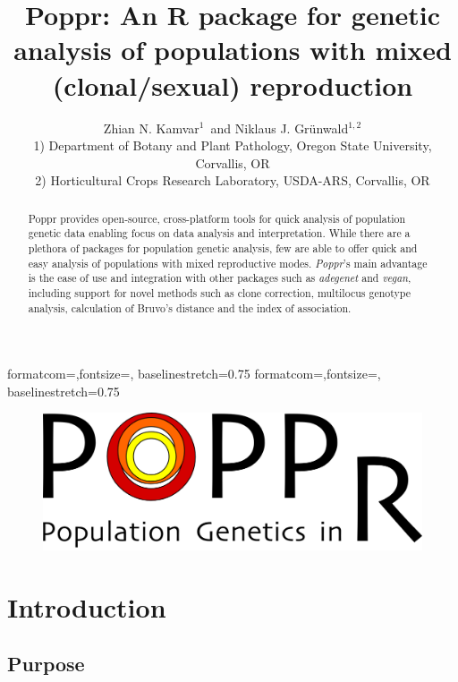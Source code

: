\documentclass[letterpaper]{article}
\title{Poppr: An R package for genetic analysis of populations with mixed (clonal/sexual) reproduction}
\author{Zhian N. Kamvar$^{1}$\ and Niklaus J. Gr\"unwald$^{1,2}$\\\scriptsize{1) Department of Botany and Plant Pathology, Oregon State University, Corvallis, OR}\\\scriptsize{2) Horticultural Crops Research Laboratory, USDA-ARS, Corvallis, OR}}
\begin{document}

{formatcom={\color{Sinput}},fontsize=\footnotesize, baselinestretch=0.75}
{formatcom={\color{Soutput}},fontsize=\footnotesize, baselinestretch=0.75}
\maketitle
\begin{abstract}
Poppr provides open-source, cross-platform tools for quick analysis of population genetic data enabling focus on data analysis and interpretation. While there are a plethora of packages for population genetic analysis, few are able to offer quick and easy analysis of populations with mixed reproductive modes. \textit{Poppr}'s main advantage is the ease of use and integration with other packages such as \textit{adegenet} and \textit{vegan}, including support for novel methods such as clone correction, multilocus genotype analysis, calculation of Bruvo's distance and the index of association. 
\end{abstract}
\begin{figure}[b]
  \centering
  \label{logo}
  \includegraphics{popprlogo}
\end{figure}
\newpage
\begingroup
\hypersetup{linkcolor=black}
\tableofcontents
\endgroup
\section{Introduction}
\subsection{Purpose}
\end{document}
